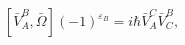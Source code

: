 \begin{equation}\label{4.6}
[\bar{V}^B_A,\bar{\Omega}](-1)^{\varepsilon_B}=i\hbar\bar{V}^C_A\bar{V}^B_C,
\end{equation}

